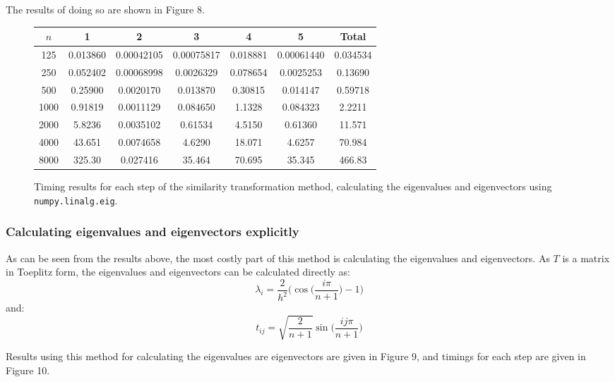 \documentclass{article}
\numberwithin{equation}{section}
\begin{document}
The results of doing so are shown in Figure 8.

\begin{figure}[H]
\centering
\begin{tabular}{|c|c|c|c|c|c|c|}
\hline
$n$ & 1 & 2 & 3 & 4 & 5 & Total \\
\hline
125 & 0.013860 & 0.00042105 & 0.00075817 & 0.018881 & 0.00061440 & 0.034534 \\
250 & 0.052402 & 0.00068998 & 0.0026329 & 0.078654 & 0.0025253 & 0.13690 \\
500 & 0.25900 & 0.0020170 & 0.013870 & 0.30815 & 0.014147 & 0.59718 \\
1000 & 0.91819 & 0.0011129 & 0.084650 & 1.1328 & 0.084323 & 2.2211 \\
2000 & 5.8236 & 0.0035102 & 0.61534 & 4.5150 & 0.61360 & 11.571 \\
4000 & 43.651 & 0.0074658 & 4.6290 & 18.071 & 4.6257 & 70.984 \\
8000 & 325.30 & 0.027416 & 35.464 & 70.695 & 35.345 & 466.83 \\
\hline
\end{tabular}
\captionsetup{justification=centering}
\caption{Timing results for each step of the similarity transformation method, calculating the eigenvalues and eigenvectors using \texttt{numpy.linalg.eig}.}
\end{figure}

\subsubsection*{Calculating eigenvalues and eigenvectors explicitly}

As can be seen from the results above, the most costly part of this method is calculating the eigenvalues and eigenvectors. As $T$ is a matrix in Toeplitz form, the eigenvalues and eigenvectors can be calculated directly as:
\[ \lambda_i = \frac{2}{h^2} \Big( \cos \Big( \frac{i \pi}{n+1} \Big) - 1 \Big) \]
and:
\[ t_{ij} = \sqrt{\frac{2}{n+1}} \sin \Big( \frac{ij \pi}{n+1}  \Big) \]

Results using this method for calculating the eigenvalues are eigenvectors are given in Figure 9, and timings for each step are given in Figure 10.
\end{document}
